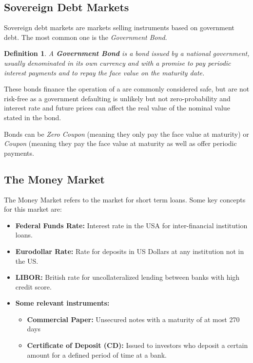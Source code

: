 \documentclass[10pt,letterpaper]{article}
\newtheorem{definition}{Definition}
\begin{document}
\subsection{Sovereign Debt Markets}
Sovereign debt markets are markets selling instruments based on government debt. The most common one is the \emph{Government Bond}.

\begin{definition}
A \emph{\textbf{Government Bond}} is a bond issued by a national government, usually denominated in its own currency and with a promise to pay periodic interest payments and to repay the face value on the maturity date.
\end{definition}


These bonds finance the operation of a are commonly considered safe, but are not risk-free as a government defaulting is unlikely but not zero-probability and interest rate and future prices can affect the real value of the nominal value stated in the bond.

Bonds can be \emph{Zero Coupon} (meaning they only pay the face value at maturity) or \emph{Coupon} (meaning they pay the face value at maturity as well as offer periodic payments.

\subsection{The Money Market}
The Money Market refers to the market for short term loans. Some key concepts for this market are:
\begin{itemize}
\item \textbf{Federal Funds Rate:} Interest rate in the USA for inter-financial institution loans.
\item \textbf{Eurodollar Rate:} Rate for deposits in US Dollars at any institution not in the US.
\item \textbf{LIBOR:} British rate for uncollateralized lending between banks with high credit score.
\item \textbf{Some relevant instruments:}
\begin{itemize}
\item \textbf{Commercial Paper:} Unsecured notes with a maturity of at most 270 days
\item \textbf{Certificate of Deposit (CD):} Issued to investors who deposit a certain amount for a defined period of time at a bank.
\end{itemize}
\end{itemize}
\end{document}
